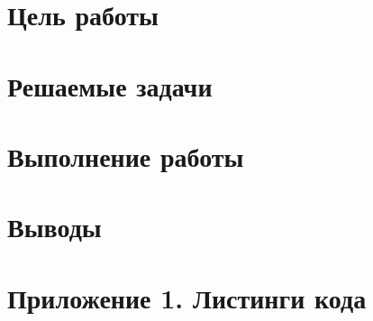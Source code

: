 




\tableofcontents
\newpage

\section{Цель работы}

\section{Решаемые задачи}

\section{Выполнение работы}

\section{Выводы}


\newpage

\section*{Приложение 1. Листинги кода}



